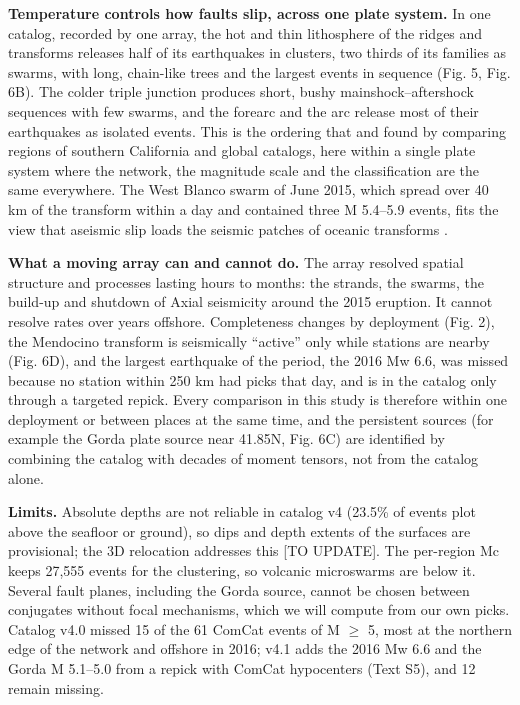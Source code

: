 \documentclass[11pt]{article}
\begin{document}
\textbf{Temperature controls how faults slip, across one plate system.}
In one catalog, recorded by one array, the hot and thin lithosphere of
the ridges and transforms releases half of its earthquakes in clusters,
two thirds of its families as swarms, with long, chain-like trees and
the largest events in sequence (Fig. 5, Fig. 6B). The colder triple
junction produces short, bushy mainshock--aftershock sequences with few
swarms, and the forearc and the arc release most of their earthquakes as
isolated events. This is the ordering that \citet{Zaliapin2013} and
\citet{Zaliapin2016} found by comparing regions of southern California
and global catalogs, here within a single plate system where the
network, the magnitude scale and the classification are the same
everywhere. The West Blanco swarm of June 2015, which spread over 40 km
of the transform within a day and contained three M 5.4--5.9 events,
fits the view that aseismic slip loads the seismic patches of oceanic
transforms \citep{McGuire2005, Roland2009, Boettcher2009}.

\textbf{What a moving array can and cannot do.} The array resolved
spatial structure and processes lasting hours to months: the strands,
the swarms, the build-up and shutdown of Axial seismicity around the
2015 eruption. It cannot resolve rates over years offshore. Completeness
changes by deployment (Fig. 2), the Mendocino transform is seismically
``active'' only while stations are nearby (Fig. 6D), and the largest
earthquake of the period, the 2016 Mw 6.6, was missed because no station
within 250 km had picks that day, and is in the catalog only through a
targeted repick. Every comparison in this study is therefore within one
deployment or between places at the same time, and the persistent
sources (for example the Gorda plate source near 41.85\textdegree{}N, Fig. 6C) are
identified by combining the catalog with decades of moment tensors, not
from the catalog alone.

\textbf{Limits.} Absolute depths are not reliable in catalog v4 (23.5\%
of events plot above the seafloor or ground), so dips and depth extents
of the surfaces are provisional; the 3D relocation addresses this {[}TO
UPDATE{]}. The per-region Mc keeps 27,555 events for the clustering, so
volcanic microswarms are below it. Several fault planes, including the
Gorda source, cannot be chosen between conjugates without focal
mechanisms, which we will compute from our own picks. Catalog v4.0
missed 15 of the 61 ComCat events of M \ensuremath{\geq} 5, most at the northern edge of
the network and offshore in 2016; v4.1 adds the 2016 Mw 6.6 and the
Gorda M 5.1--5.0 from a repick with ComCat hypocenters (Text S5), and 12
remain missing.
\end{document}
